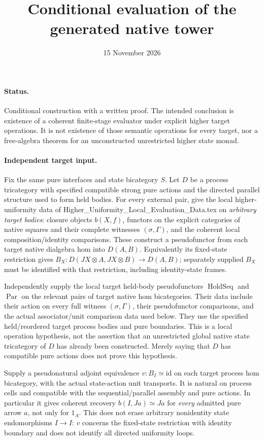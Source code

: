 \documentclass{article}
\title{Conditional evaluation of the generated native tower}
\date{15 November 2026}
\begin{document}
\maketitle
\paragraph{Status.} Conditional construction with a written proof. The intended conclusion is existence of a coherent finite-stage evaluator under explicit higher target operations. It is not existence of those semantic operations for every target, nor a free-algebra theorem for an unconstructed unrestricted higher state monad.

\paragraph{Independent target input.} Fix the same pure interfaces and state bicategory $S$. Let $D$ be a process tricategory with specified compatible strong pure actions and the directed parallel structure used to form held bodies. For every external pair, give the local higher-uniformity data of Higher\_Uniformity\_Local\_Evaluation\_Data.tex on \emph{arbitrary target bodies}: closure objects $b(X,f)$, functors on the explicit categories of native squares and their complete witnesses $(\sigma,\Gamma)$, and the coherent local composition/identity comparisons. These construct a pseudofunctor from each target native dialgebra hom into $D(A,B)$. Equivalently its fixed-state restriction gives $B_X:D(JX\otimes A,JX\otimes B)\to D(A,B)$; separately supplied $B_X$ must be identified with that restriction, including identity-state frames.

Independently supply the local target held-body pseudofunctors $\operatorname{HoldSeq}$ and $\operatorname{Par}$ on the relevant pairs of target native hom bicategories. Their data include their action on every full witness $(\sigma,\Gamma)$, their pseudofunctor comparisons, and the actual associator/unit comparison data used below. They use the specified held/reordered target process bodies and pure boundaries. This is a local operation hypothesis, not the assertion that an unrestricted global native state tricategory of $D$ has already been constructed. Merely saying that $D$ has compatible pure actions does not prove this hypothesis.

Supply a pseudonatural adjoint equivalence $v:B_I\simeq\mathrm{id}$ on each target process hom bicategory, with the actual state-action unit transports. It is natural on process cells and compatible with the sequential/parallel assembly and pure actions. In particular it gives coherent recovery $b(I,Ja)\simeq Ja$ for \emph{every} admitted pure arrow $a$, not only for $1_A$. This does not erase arbitrary nonidentity state endomorphisms $I\to I$: $v$ concerns the fixed-state restriction with identity boundary and does not identify all directed uniformity loops.
\end{document}
